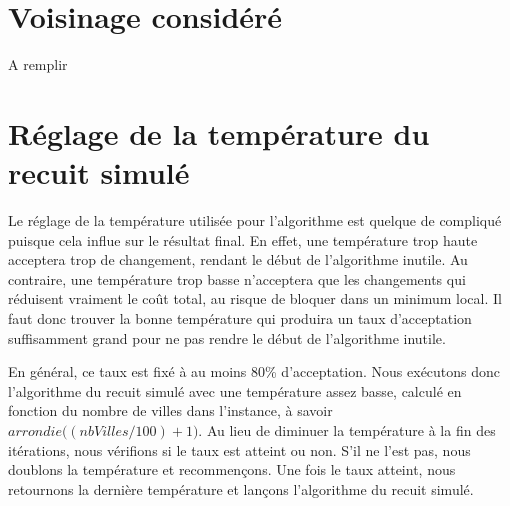 \documentclass{article}
\begin{document}
\section{Voisinage considéré}

A remplir

\section{Réglage de la température du recuit simulé}

Le réglage de la température utilisée pour l'algorithme est quelque de compliqué puisque cela influe sur le résultat final.
En effet, une température trop haute acceptera trop de changement, rendant le début de l'algorithme inutile.
Au contraire, une température trop basse n'acceptera que les changements qui réduisent vraiment le coût total, au risque de bloquer dans un minimum local.
Il faut donc trouver la bonne température qui produira un taux d'acceptation suffisamment grand pour ne pas rendre le début de l'algorithme inutile.

En général, ce taux est fixé à au moins 80\% d'acceptation.
Nous exécutons donc l'algorithme du recuit simulé avec une température assez basse, calculé en fonction du nombre de villes dans l'instance, à savoir $arrondie\big((nbVilles / 100) + 1\big)$.
Au lieu de diminuer la température à la fin des itérations, nous vérifions si le taux est atteint ou non.
S'il ne l'est pas, nous doublons la température et recommençons.
Une fois le taux atteint, nous retournons la dernière température et lançons l'algorithme du recuit simulé.
\end{document}
